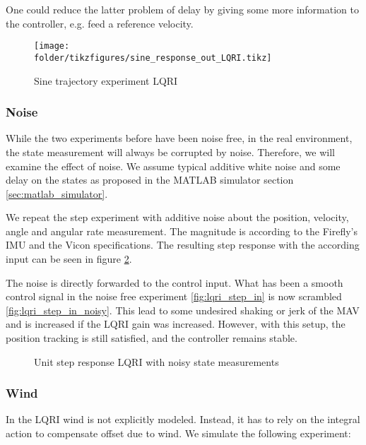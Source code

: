 One could reduce the latter problem of delay by giving some more information to the controller, e.g. feed a reference velocity.

\begin{figure}
\centering
\texttt{[image: \\folder/tikzfigures/sine\_response\_out\_LQRI.tikz]}
\caption{Sine trajectory experiment LQRI}
\label{fig:lqri_sine}
\end{figure} 

\subsubsection{Noise}
While the two experiments before have been noise free, in the real environment, the state measurement will always be corrupted by noise. Therefore, we will examine the effect of noise. We assume typical additive white noise and some delay on the states as proposed in the MATLAB simulator section \ref{sec:matlab_simulator}.

We repeat the step experiment with additive noise about the position, velocity, angle and angular rate measurement. The magnitude is according to the Firefly's IMU and the Vicon specifications. The resulting step response with the according input can be seen in figure \ref{fig:lqri_step_noisy}.

The noise is directly forwarded to the control input. What has been a smooth control signal in the noise free experiment \ref{fig:lqri_step_in} is now scrambled \ref{fig:lqri_step_in_noisy}. This lead to some undesired shaking or jerk of the MAV and is increased if the LQRI gain was increased. However, with this setup, the position tracking is still satisfied, and the controller remains stable.

\begin{figure}
\centering
{}
\qquad
{}
\caption{Unit step response LQRI with noisy state measurements}
\label{fig:lqri_step_noisy}
\end{figure}

\subsubsection{Wind}
In the LQRI wind is not explicitly modeled. Instead, it has to rely on the integral action to compensate offset due to wind. We simulate the following experiment:

